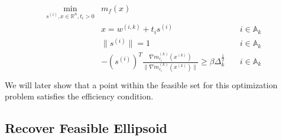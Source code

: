 \documentclass{article}
\newenvironment{comment}
  {\par\medskip
   \color{red}%
   \begin{framed}
   \textbf{Comment: }\ignorespaces}
 {\end{framed}
  \medskip}
\theoremstyle{case}
\numberwithin{theorem}{subsection}
\newcommand{\activeconstraintsk}{{\mathbb A_{k}}}
\newcommand{\dk}{\Delta_k}
\newcommand{\hgik}{{\frac{\nabla m^{(k)}_{c_i}(\xk)}{\|\nabla m^{(k)}_{c_i}(\xk)\|}}}
\newcommand{\mcik}{{{m}^{(k)}_{c_i}}}
\newcommand{\mfk}{{{m}_f}^{(k)}}
\newcommand{\reals}{\mathbb R}
\newcommand{\Rn}{\mathbb R^n}
\newcommand{\trsinfset}{{E_\textrm{infeasible}}}
\newcommand{\trstol}{{\delta_\textrm{infeasible}}}
\newcommand{\wik}{{w^{(i, k)}}}
\newcommand{\xk}{{x^{(k)}}}
\begin{document}
\begin{align}
\label{capcones_tr_subproblem}
\begin{array}{ccc}
\min_{s^{(i)},x\in\Rn,t_i>0} & m_f(x) & \\
 & x = \wik + t _i s^{(i)} & \quad  i \in \activeconstraintsk \\
 & \|s^{(i)}\| = 1 & \quad i \in \activeconstraintsk \\
 & -\left(s^{(i)}\right)^T\hgik \ge \beta \dk^{\frac 1 2 } & \quad  i \in \activeconstraintsk \\
\end{array}
\end{align}
We will later show that a point within the feasible set for this optimization problem satisfies the efficiency condition.


% 
% 
% 
% 
% 
% 



\subsection{Recover Feasible Ellipsoid}
\end{document}
